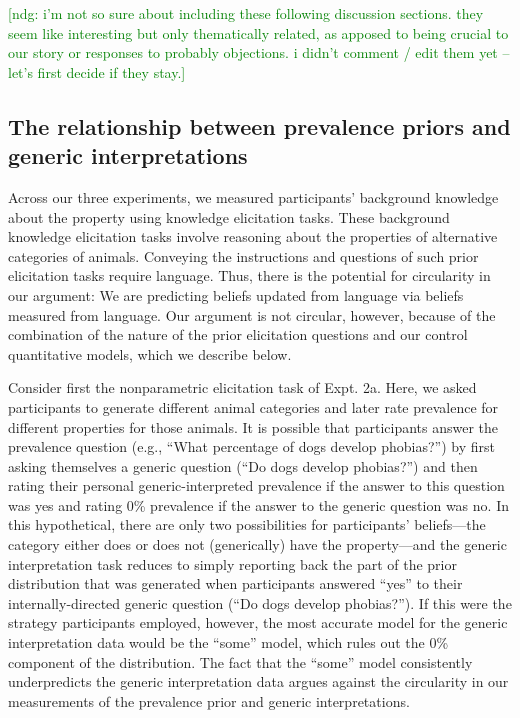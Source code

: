 \documentclass[floatsintext,doc]{apa6}
\begin{document}
{\textcolor{Green}{[ndg: i'm not so sure about including these following discussion sections. they seem like interesting but only thematically related, as apposed to being crucial to our story or responses to probably objections. i didn't comment / edit them yet -- let's first decide if they stay.]}}

\hypertarget{the-relationship-between-prevalence-priors-and-generic-interpretations}{%
\subsection{The relationship between prevalence priors and generic interpretations}\label{the-relationship-between-prevalence-priors-and-generic-interpretations}}

Across our three experiments, we measured participants' background knowledge about the property using knowledge elicitation tasks.
These background knowledge elicitation tasks involve reasoning about the properties of alternative categories of animals.
Conveying the instructions and questions of such prior elicitation tasks require language.
Thus, there is the potential for circularity in our argument: We are predicting beliefs updated from language via beliefs measured from language.
Our argument is not circular, however, because of the combination of the nature of the prior elicitation questions and our control quantitative models, which we describe below.

Consider first the nonparametric elicitation task of Expt. 2a.
Here, we asked participants to generate different animal categories and later rate prevalence for different properties for those animals.
It is possible that participants answer the prevalence question (e.g., \enquote{What percentage of dogs develop phobias?}) by first asking themselves a generic question (\enquote{Do dogs develop phobias?}) and then rating their personal generic-interpreted prevalence if the answer to this question was yes and rating 0\% prevalence if the answer to the generic question was no.
In this hypothetical, there are only two possibilities for participants' beliefs---the category either does or does not (generically) have the property---and the generic interpretation task reduces to simply reporting back the part of the prior distribution that was generated when participants answered \enquote{yes} to their internally-directed generic question (\enquote{Do dogs develop phobias?}).
If this were the strategy participants employed, however, the most accurate model for the generic interpretation data would be the \enquote{some} model, which rules out the 0\% component of the distribution.
The fact that the \enquote{some} model consistently underpredicts the generic interpretation data argues against the circularity in our measurements of the prevalence prior and generic interpretations.
\end{document}
